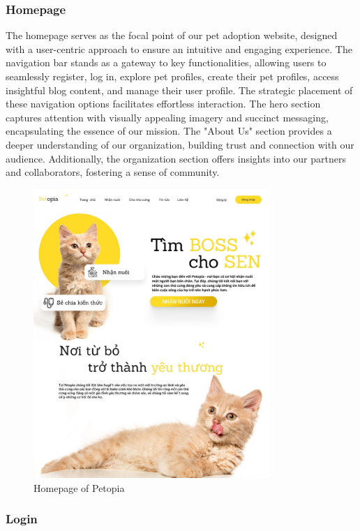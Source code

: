 \subsubsection{Homepage}

The homepage serves as the focal point of our pet adoption website, designed with a user-centric approach to ensure an intuitive and engaging experience. The navigation bar stands as a gateway to key functionalities, allowing users to seamlessly register, log in, explore pet profiles, create their pet profiles, access insightful blog content, and manage their user profile. The strategic placement of these navigation options facilitates effortless interaction. The hero section captures attention with visually appealing imagery and succinct messaging, encapsulating the essence of our mission. The "About Us" section provides a deeper understanding of our organization, building trust and connection with our audience. Additionally, the organization section offers insights into our partners and collaborators, fostering a sense of community.

\begin {figure}[H]
\centering
\includegraphics[width=0.8\textwidth]{Figures/UI/home_ui.jpg}
\caption{Homepage of Petopia}
\end{figure}

\subsubsection{Login}

